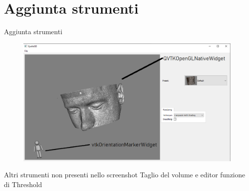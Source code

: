\documentclass{beamer}
\begin{document}
	\section{Aggiunta strumenti}
	\begin{frame}{Aggiunta strumenti}
	
	\begin{figure}[ht]
    	\centering
    	\includegraphics[width=.8\textwidth]{Images/basicwidget.png}
	\end{figure}	
	
	\begin{block}{Altri strumenti non presenti nello screenshot}
		Taglio del volume e editor funzione di Threshold
	\end{block}		
	
	\end{frame}
	
	
\end{document}
